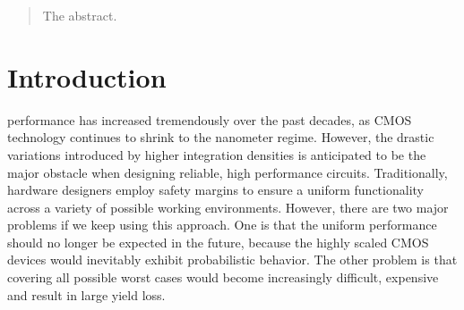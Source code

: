 \documentclass[journal]{IEEEtran}
\begin{document}
\begin{abstract}
The abstract.
\end{abstract}

\begin{IEEEkeywords}

\end{IEEEkeywords}


%
\IEEEpeerreviewmaketitle



\section{Introduction}
%
%
%
%

 performance has increased tremendously over the past decades, as CMOS technology continues to shrink to the nanometer regime. However, the drastic variations introduced by higher integration densities is anticipated to be the major obstacle when designing reliable, high performance circuits. Traditionally, hardware designers employ safety margins to ensure a uniform functionality across a variety of possible working environments. However, there are two major problems if we keep using this approach. One is that the uniform performance should no longer be expected in the future, because the highly scaled CMOS devices would inevitably exhibit probabilistic behavior. The other problem is that covering all possible worst cases would become increasingly difficult, expensive and result in large yield loss.
\end{document}
